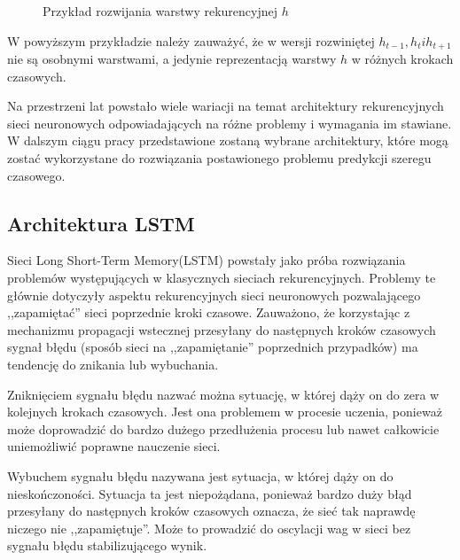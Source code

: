 \documentclass[10pt,a4paper]{article}
\begin{document}
\begin{figure}[!ht]
	\centering
	\caption{Przykład rozwijania warstwy rekurencyjnej $h$}
\end{figure}
\FloatBarrier

W powyższym przykładzie należy zauważyć, że w wersji rozwiniętej $h_{t-1}, h_t i h_{t+1}$ nie są osobnymi warstwami, a jedynie reprezentacją warstwy $h$ w różnych krokach czasowych. 

Na przestrzeni lat powstało wiele wariacji na temat architektury rekurencyjnych sieci neuronowych odpowiadających na różne problemy i wymagania im stawiane. W dalszym ciągu pracy przedstawione zostaną wybrane architektury, które mogą zostać wykorzystane do rozwiązania postawionego problemu predykcji szeregu czasowego.


\subsection{Architektura LSTM}
Sieci Long Short-Term Memory(LSTM) powstały jako próba rozwiązania problemów występujących w klasycznych sieciach rekurencyjnych. Problemy te głównie dotyczyły aspektu rekurencyjnych sieci neuronowych pozwalającego ,,zapamiętać'' sieci poprzednie kroki czasowe. Zauważono, że korzystając z mechanizmu propagacji wstecznej przesyłany do następnych kroków czasowych sygnał błędu (sposób sieci na ,,zapamiętanie'' poprzednich przypadków) ma tendencję do znikania lub wybuchania. 

Zniknięciem sygnału błędu nazwać można sytuację, w której dąży on do zera w kolejnych krokach czasowych. Jest ona problemem w procesie uczenia, ponieważ może doprowadzić do bardzo dużego przedłużenia procesu lub nawet całkowicie uniemożliwić poprawne nauczenie sieci.

Wybuchem sygnału błędu nazywana jest sytuacja, w której dąży on do nieskończoności. Sytuacja ta jest niepożądana, ponieważ bardzo duży błąd przesyłany do następnych kroków czasowych oznacza, że sieć tak naprawdę niczego nie ,,zapamiętuje''. Może to prowadzić do oscylacji wag w sieci bez sygnału błędu stabilizującego wynik. 
\end{document}
